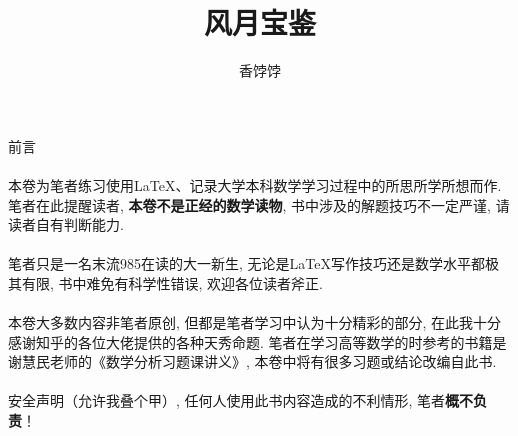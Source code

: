 \documentclass[10pt,a4paper]{book}
\title{\Huge 风月宝鉴}
\author{香饽饽}
\date{}
\theoremstyle{thmstyle} %
\theoremstyle{defstyle} %
\theoremstyle{prostyle} %
\begin{document}
	\begin{titlepage}	
	\end{titlepage}

	\maketitle
	
	
	\frontmatter
	\begin{center}
		{\Huge 前言} \\
	\end{center}
	\paragraph{}
	\paragraph{}\quad 本卷为笔者练习使用\LaTeX 、记录大学本科数学学习过程中的所思所学所想而作. 笔者在此提醒读者, \textbf{本卷不是正经的数学读物}, 书中涉及的解题技巧不一定严谨, 请读者自有判断能力.
	\paragraph{}\quad 笔者只是一名末流985在读的大一新生, 无论是\LaTeX 写作技巧还是数学水平都极其有限, 书中难免有科学性错误, 欢迎各位读者斧正.
	\paragraph{}\quad 本卷大多数内容非笔者原创, 但都是笔者学习中认为十分精彩的部分, 在此我十分感谢知乎的各位大佬提供的各种天秀命题. 笔者在学习高等数学的时参考的书籍是谢慧民老师的《数学分析习题课讲义》, 本卷中将有很多习题或结论改编自此书.
	
	\paragraph{}\quad 安全声明（允许我叠个甲）, 任何人使用此书内容造成的不利情形, 笔者\textbf{概不负责}！
	
	\paragraph{}
	
	\paragraph{}
	
\end{document}
